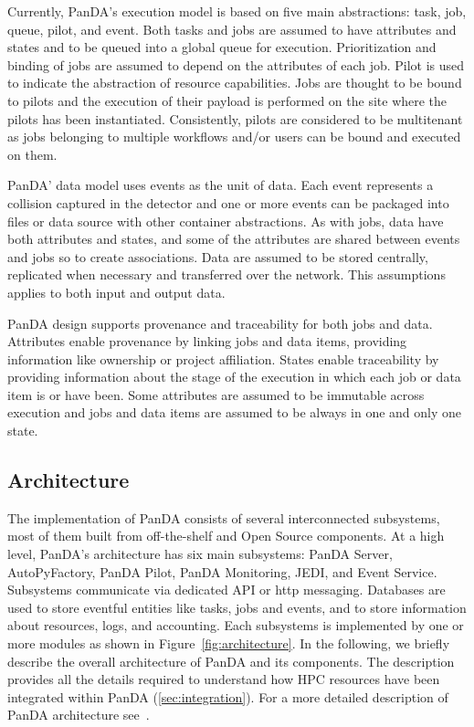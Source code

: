 Currently, PanDA's execution model is based on five main abstractions: task,
job, queue, pilot, and event. Both tasks and jobs are assumed to have attributes
and states and to be queued into a global queue for execution. Prioritization
and binding of jobs are assumed to depend on the attributes of each job. Pilot
is used to indicate the abstraction of resource capabilities. Jobs are thought
to be bound to pilots and the execution of their payload is performed on the
site where the pilots has been instantiated. Consistently, pilots are considered
to be multitenant as jobs belonging to multiple workflows and/or users can be
bound and executed on them.

PanDA' data model uses events as the unit of data. Each event represents a
collision captured in the detector and one or more events can be packaged into
files or data source with other container abstractions. As with jobs, data have
both attributes and states, and some of the attributes are shared between events
and jobs so to create associations. Data are assumed to be stored centrally,
replicated when necessary and transferred over the network. This assumptions
applies to both input and output data.

PanDA design supports provenance and traceability for both jobs and data.
Attributes enable provenance by linking jobs and data items, providing
information like ownership or project affiliation. States enable traceability by
providing information about the stage of the execution in which each job or data
item is or have been. Some attributes are assumed to be immutable across
execution and jobs and data items are assumed to be always in one and only one
state.


\subsection{Architecture}
\label{ssec:panda_arch}

The implementation of PanDA consists of several interconnected subsystems, most
of them built from off-the-shelf and Open Source components. At a high level,
PanDA's architecture has six main subsystems: PanDA Server, AutoPyFactory, PanDA
Pilot, PanDA Monitoring, JEDI, and Event Service. Subsystems communicate via
dedicated API or http messaging. Databases are used to store eventful entities
like tasks, jobs and events, and to store information about resources, logs, and
accounting. Each subsystems is implemented by one or more modules as shown in
Figure~\ref{fig:architecture}. In the following, we briefly describe the overall
architecture of PanDA and its components. The description provides all the
details required to understand how HPC resources have been integrated within
PanDA (\ref{sec:integration}). For a more detailed description of PanDA
architecture see~\cite{wiki, papers}.

